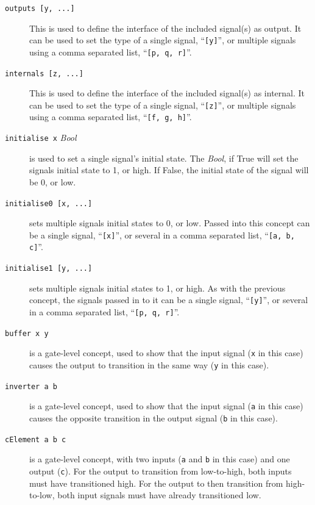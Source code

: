 \documentclass{proc}
\begin{document}
\begin{description}
   \item [\texttt{outputs [y, ...]}] This is used to define the interface of the included signal(s) as output. It can be used to set the type of a single signal, ``\texttt{[y]}'', or multiple signals 
   using a comma separated list, ``\texttt{[p, q, r]}''.
   
   \item [\texttt{internals [z, ...]}] This is used to define the interface of the included signal(s) as internal. It can be used to set the type of a single signal, ``\texttt{[z]}'', or multiple signals 
   using a comma separated list, ``\texttt{[f, g, h]}''.
  
  \item [\texttt{initialise x} \emph{Bool}] is used to set a single signal's initial state. The \emph{Bool}, if True will set the signals initial state to 1, or high. If False, the initial state of the 
  signal will be 0, or low. 

  \item [\texttt{initialise0 [x, ...]}] sets multiple signals initial states to 0, or low. Passed into this concept can be a single signal, ``\texttt{[x]}'', or several in a comma separated list, 
  ``\texttt{[a, b, c]}''.
  
  \item [\texttt{initialise1 [y, ...]}] sets multiple signals initial states to 1, or high. As with the previous concept, the signals passed in to it can be a single signal, ``\texttt{[y]}'', or several in 
  a comma separated list, ``\texttt{[p, q, r]}''.
  
  \item [\texttt{buffer x y}] is a gate-level concept, used to show that the input signal (\texttt{x} in this case) causes the output to transition in the same way (\texttt{y} in this case). 
  
  \item [\texttt{inverter a b}] is a gate-level concept, used to show that the input signal (\texttt{a} in this case) causes the opposite transition in the output signal (\texttt{b} in this case).
  
  \item [\texttt{cElement a b c}] is a gate-level concept, with two inputs (\texttt{a} and \texttt{b} in this case) and one output (\texttt{c}). For the output to transition from low-to-high, 
  both inputs must have transitioned high. For the output to then transition from high-to-low, both input signals must have already transitioned low.
  

\end{description}
\end{document}
